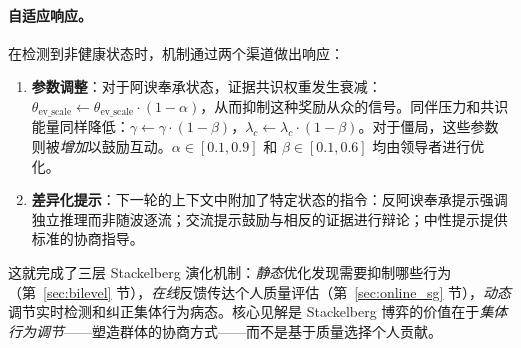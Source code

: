 \paragraph{自适应响应。}
在检测到非健康状态时，机制通过两个渠道做出响应：
\begin{enumerate}
    \item \textbf{参数调整}：对于阿谀奉承状态，证据共识权重发生衰减：$\theta_{\text{ev\_scale}} \leftarrow \theta_{\text{ev\_scale}} \cdot (1 - \alpha)$，从而抑制这种奖励从众的信号。同伴压力和共识能量同样降低：$\gamma \leftarrow \gamma \cdot (1 - \beta)$，$\lambda_c \leftarrow \lambda_c \cdot (1 - \beta)$。对于僵局，这些参数则被\emph{增加}以鼓励互动。$\alpha \in [0.1, 0.9]$ 和 $\beta \in [0.1, 0.6]$ 均由领导者进行优化。
    \item \textbf{差异化提示}：下一轮的上下文中附加了特定状态的指令：反阿谀奉承提示强调独立推理而非随波逐流；交流提示鼓励与相反的证据进行辩论；中性提示提供标准的协商指导。
\end{enumerate}

这就完成了三层 Stackelberg 演化机制：\emph{静态}优化发现需要抑制哪些行为（第~\ref{sec:bilevel} 节），\emph{在线}反馈传达个人质量评估（第~\ref{sec:online_sg} 节），\emph{动态}调节实时检测和纠正集体行为病态。核心见解是 Stackelberg 博弈的价值在于\emph{集体行为调节}——塑造群体的协商方式——而不是基于质量选择个人贡献。
